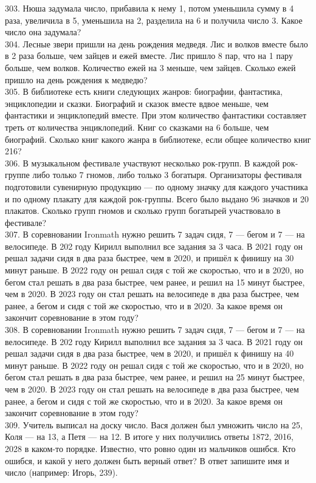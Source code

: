 303. Нюша задумала число, прибавила к нему 1, потом уменьшила сумму в 4 раза, увеличила в 5, уменьшила на 2, разделила на 6 и получила число 3. Какое число она задумала?\\
304. Лесные звери пришли на день рождения медведя. Лис и волков вместе было в 2 раза больше, чем зайцев и ежей вместе. Лис пришло 8 пар, что на 1 пару больше, чем волков. Количество ежей на 3 меньше, чем зайцев. Сколько ежей пришло на день рождения к медведю?\\
305. В библиотеке есть книги следующих жанров: биографии, фантастика, энциклопедии и сказки. Биографий и сказок вместе вдвое меньше, чем фантастики и энциклопедий вместе. При этом количество фантастики составляет треть от количества энциклопедий. Книг со сказками на 6 больше, чем биографий. Сколько книг какого жанра в библиотеке, если общее количество книг 216?\\
306. В музыкальном фестивале участвуют несколько рок-групп. В каждой рок-группе либо только 7 гномов, либо только 3 богатыря. Организаторы фестиваля подготовили сувенирную продукцию --- по одному значку для каждого участника и по одному плакату для каждой рок-группы. Всего было выдано 96 значков и 20 плакатов. Сколько групп гномов и сколько групп богатырей участвовало в фестивале?\\
307. В соревновании Ironmath нужно решить 7 задач сидя, 7 --- бегом и 7 --- на велосипеде. В 202 году Кирилл выполнил все задания за 3 часа. В 2021 году он решал задачи сидя в два раза быстрее, чем в 2020, и пришёл к финишу на 30 минут раньше. В 2022 году он решал сидя с той же скоростью, что и в 2020, но бегом стал решать в два раза быстрее, чем ранее, и решил на 15 минут быстрее, чем в 2020. В 2023 году он стал решать на велосипеде в два раза быстрее, чем ранее, а бегом и сидя с той же скоростью, что и в 2020. За какое время он закончит соревнование в этом году?\\
308. В соревновании Ironmath нужно решить 7 задач сидя, 7 --- бегом и 7 --- на велосипеде. В 202 году Кирилл выполнил все задания за 3 часа. В 2021 году он решал задачи сидя в два раза быстрее, чем в 2020, и пришёл к финишу на 40 минут раньше. В 2022 году он решал сидя с той же скоростью, что и в 2020, но бегом стал решать в два раза быстрее, чем ранее, и решил на 25 минут быстрее, чем в 2020. В 2023 году он стал решать на велосипеде в два раза быстрее, чем ранее, а бегом и сидя с той же скоростью, что и в 2020. За какое время он закончит соревнование в этом году?\\
309. Учитель выписал на доску число. Вася должен был умножить число на 25, Коля --- на 13, а Петя --- на 12. В итоге у них получились ответы 1872, 2016, 2028 в каком-то порядке. Известно, что ровно один из мальчиков ошибся. Кто ошибся, и какой у него должен быть верный ответ? В ответ запишите имя и число (например: Игорь, 239).\\
